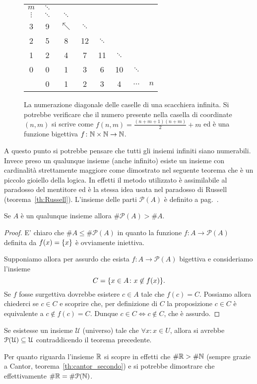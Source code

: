 \begin{figure}
  \begin{tabular}{c|ccccccc}
   $m$ & $\ddots$\\
   $\vdots$ & $\ddots$ & $\ddots$\\
   3 & 9 & $\nwarrow$ & $\ddots$ \\
   2 & 5 & 8 & 12 & $\ddots$ \\
   1 & 2 & 4 & 7 & 11 & $\ddots$ \\
   0 & 0 & 1 & 3 & 6 & 10 & $\ddots$ \\ \hline
     & 0 & 1 & 2 & 3 & 4 & $\dots$ & $n$
  \end{tabular}
  \caption{
    La numerazione diagonale delle caselle
    di una scacchiera infinita. Si potrebbe verificare
    che il numero presente nella casella di coordinate $(n,m)$
    si scrive come $f(n,m) = \frac{(n+m+1)(n+m)}{2}+m$
    ed è una funzione bigettiva $f\colon \NN\times\NN \to\NN$.}
  \label{fig:cantor1}
\end{figure}

A questo punto si potrebbe pensare che
tutti gli insiemi infiniti siano numerabili.
Invece preso un qualunque insieme (anche infinito)
esiste un insieme con cardinalità strettamente maggiore
come dimostrato nel seguente teorema che è un piccolo gioiello della logica.
In effetti il metodo utilizzato è assimilabile al paradosso del mentitore 
ed è la stessa idea usata nel paradosso di Russell (teorema~\ref{th:Russell}).
L'insieme delle parti $\mathcal P(A)$ è definito a pag.~\pageref{def:insieme_parti}.
%
\begin{theorem}[Cantor]%
\label{th:Cantor}%
  Se $A$ è un qualunque insieme allora $\# \mathcal P(A) > \# A$.
\end{theorem}
%
\begin{proof}
  E' chiaro che $\# A \le \#\mathcal P(A)$ in quanto 
  la funzione $f\colon A \to \mathcal P(A)$ definita da $f(x)=\ENCLOSE{x}$
  è ovviamente iniettiva.

  Supponiamo allora per assurdo che esista $f\colon A\to \mathcal P(A)$
  bigettiva e consideriamo l'insieme 
  \[
    C = \ENCLOSE{x\in A \colon x\not\in f(x)}.  
  \]
  Se $f$ fosse surgettiva dovrebbe esistere $c\in A$ tale che $f(c) = C$.
  Possiamo allora chiederci se $c\in C$ e scoprire che, 
  per definizione di $C$ la proposizione $c\in C$ è equivalente 
  a $c\not\in f(c) = C$. 
  Dunque $c\in C \iff c\not\in C$, che è assurdo.
\end{proof}
%
\begin{corollary}
  Se esistesse un insieme $\mathcal U$ (universo) 
  tale che $\forall x\colon x \in U$, allora 
  si avrebbe $\mathcal \P(\mathcal U) \subset \mathcal U$
  contraddicendo il teorema precedente.
\end{corollary}
%
Per quanto riguarda l'insieme $\RR$ si
scopre in effetti che $\#\RR > \#\NN$
(sempre grazie a Cantor, teorema~\ref{th:cantor_secondo})
e si potrebbe dimostrare che effettivamente $\#\RR = \#\mathcal P(\NN)$.

